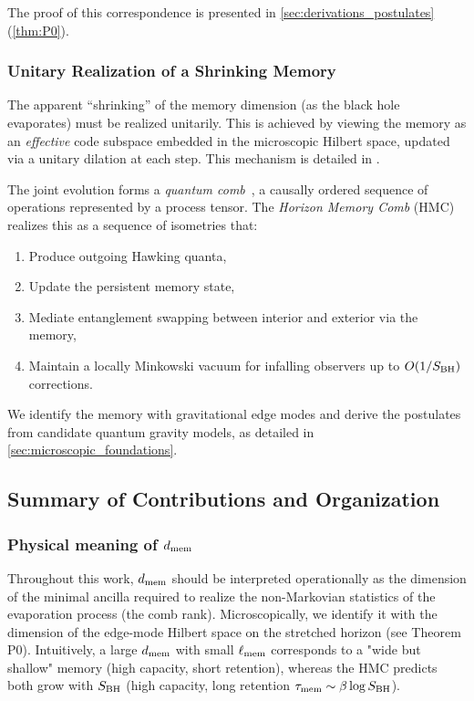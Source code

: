 \documentclass[aps,prd,preprint,onecolumn,superscriptaddress,nofootinbib,longbibliography,floatfix,11pt,showpacs,showkeys]{revtex4-2}
\newcommand{\HMC}{\textsc{HMC}\xspace}
\theoremstyle{plain}
\theoremstyle{definition}
\theoremstyle{remark}
\begin{document}
The proof of this correspondence is presented in \cref{sec:derivations_postulates} (\cref{thm:P0}).

\subsubsection{Unitary Realization of a Shrinking Memory}
The apparent ``shrinking'' of the memory dimension (as the black hole evaporates) must be realized unitarily. This is achieved by viewing the memory as an \emph{effective} code subspace embedded in the microscopic Hilbert space, updated via a unitary dilation at each step. This mechanism is detailed in .

The joint evolution forms a \emph{quantum comb}~\cite{Chiribella:2009, Pollock:2018}, a causally ordered sequence of operations represented by a process tensor. The \emph{Horizon Memory Comb} (\HMC{}) realizes this as a sequence of isometries that:
\begin{enumerate}
    \item Produce outgoing Hawking quanta,
    \item Update the persistent memory state,
    \item Mediate entanglement swapping between interior and exterior via the memory,
    \item Maintain a locally Minkowski vacuum for infalling observers up to $O(1/S_{\rm BH})$ corrections.
\end{enumerate}
We identify the memory with gravitational edge modes and derive the postulates from candidate quantum gravity models, as detailed in \cref{sec:microscopic_foundations}.

\subsection{Summary of Contributions and Organization}
\label{sec:contributions}

\subsubsection{Physical meaning of $d_{\rm mem}$}
Throughout this work, $d_{\rm mem}$ should be interpreted operationally as the dimension of the minimal ancilla required to realize the non-Markovian statistics of the evaporation process (the comb rank).
Microscopically, we identify it with the dimension of the edge-mode Hilbert space on the stretched horizon (see Theorem P0).
Intuitively, a large $d_{\rm mem}$ with small $\ell_{\rm mem}$ corresponds to a "wide but shallow" memory (high capacity, short retention), whereas the HMC predicts both grow with $S_{\rm BH}$ (high capacity, long retention $\tau_{\rm mem}\sim \beta \log S_{\rm BH}$).
\end{document}

